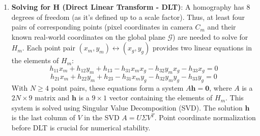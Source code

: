 \documentclass[12pt, a4paper]{article}
\begin{document}
\begin{enumerate}
    \item \textbf{Solving for H (Direct Linear Transform - DLT)}:
    A homography has 8 degrees of freedom (as it's defined up to a scale factor). Thus, at least four pairs of corresponding points (pixel coordinates in camera $C_m$ and their known real-world coordinates on the global plane $\mathcal{G}$) are needed to solve for $H_m$. Each point pair $(x_m,y_m) \leftrightarrow (x_g,y_g)$ provides two linear equations in the elements of $H_m$:
        $$h_{11}x_m + h_{12}y_m + h_{13} - h_{31}x_m x_g - h_{32}y_m x_g - h_{33}x_g = 0$$
        $$h_{21}x_m + h_{22}y_m + h_{23} - h_{31}x_m y_g - h_{32}y_m y_g - h_{33}y_g = 0$$
    With $N \ge 4$ point pairs, these equations form a system $A \mathbf{h} = \mathbf{0}$, where $A$ is a $2N \times 9$ matrix and $\mathbf{h}$ is a $9 \times 1$ vector containing the elements of $H_m$. This system is solved using Singular Value Decomposition (SVD). The solution $\mathbf{h}$ is the last column of $V$ in the SVD $A = U \Sigma V^T$. Point coordinate normalization before DLT is crucial for numerical stability.
\end{enumerate}
\end{document}
